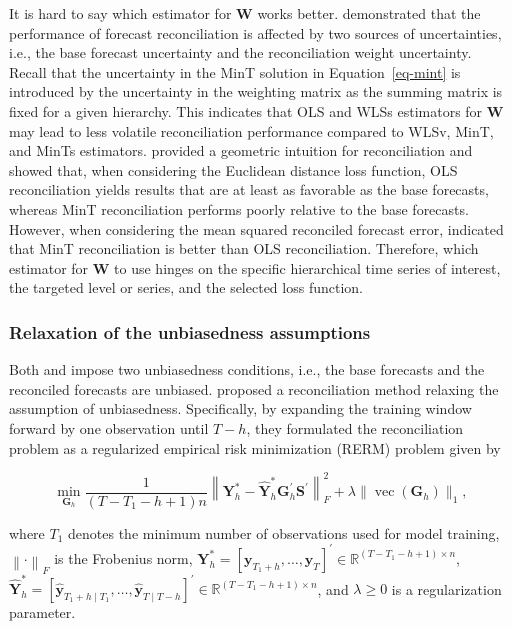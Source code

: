 \documentclass[11pt,a4paper,]{article}
\begin{document}
It is hard to say which estimator for \(\boldsymbol{W}\) works better.
\textcite{Pritularga2021-lz} demonstrated that the performance of
forecast reconciliation is affected by two sources of uncertainties,
i.e., the base forecast uncertainty and the reconciliation weight
uncertainty. Recall that the uncertainty in the MinT solution in
Equation~\ref{eq-mint} is introduced by the uncertainty in the weighting
matrix as the summing matrix is fixed for a given hierarchy. This
indicates that OLS and WLSs estimators for \(\boldsymbol{W}\) may lead
to less volatile reconciliation performance compared to WLSv, MinT, and
MinTs estimators. \textcite{Panagiotelis2021-mf} provided a geometric
intuition for reconciliation and showed that, when considering the
Euclidean distance loss function, OLS reconciliation yields results that
are at least as favorable as the base forecasts, whereas MinT
reconciliation performs poorly relative to the base forecasts. However,
when considering the mean squared reconciled forecast error,
\textcite{Wickramasuriya2021-am} indicated that MinT reconciliation is
better than OLS reconciliation. Therefore, which estimator for
\(\boldsymbol{W}\) to use hinges on the specific hierarchical time
series of interest, the targeted level or series, and the selected loss
function.

\hypertarget{relaxation-of-the-unbiasedness-assumptions}{%
\subsubsection{Relaxation of the unbiasedness
assumptions}\label{relaxation-of-the-unbiasedness-assumptions}}

Both \textcite{Hyndman2011-sd} and \textcite{Wickramasuriya2019-fc}
impose two unbiasedness conditions, i.e., the base forecasts and the
reconciled forecasts are unbiased. \textcite{Ben_Taieb2019-be} proposed
a reconciliation method relaxing the assumption of unbiasedness.
Specifically, by expanding the training window forward by one
observation until \(T-h\), they formulated the reconciliation problem as
a regularized empirical risk minimization (RERM) problem given by

\[
\min _{\boldsymbol{G}_h} \frac{1}{(T-T_1-h+1)n}\left\|\boldsymbol{Y}_{h}^{*}-\hat{\boldsymbol{Y}}_{h}^{*} \mathbf{G}_{h}^{\prime} \boldsymbol{S}^{\prime}\right\|_F^2+\lambda\|\operatorname{vec}( \boldsymbol{G}_h)\|_1,
\]

where \(T_1\) denotes the minimum number of observations used for model
training, \(\left\| \cdot \right\|_F\) is the Frobenius norm,
\(\boldsymbol{Y}_{h}^{*}=\left[\boldsymbol{y}_{T_1+h}, \ldots, \boldsymbol{y}_T\right]^{\prime} \in \mathbb{R}^{\left(T-T_1-h+1\right) \times n}\),
\(\hat{\boldsymbol{Y}}_{h}^{*}=\left[\hat{\boldsymbol{y}}_{T_1+h \mid T_1}, \ldots, \hat{\boldsymbol{y}}_{T \mid T-h}\right]^{\prime} \in \mathbb{R}^{\left(T-T_1-h+1\right) \times n}\),
and \(\lambda \geq 0\) is a regularization parameter.
\end{document}
